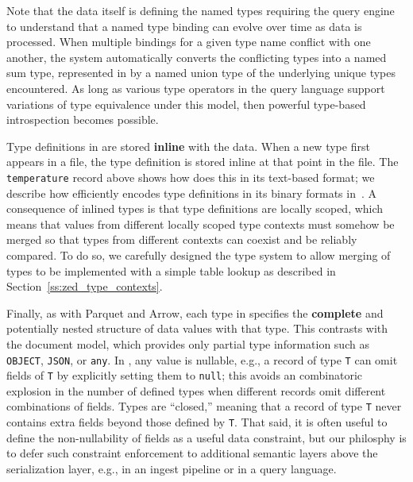 Note that the data itself is defining the named types requiring the query engine to understand that a named type binding can evolve over time as data is processed.  When multiple bindings for a given type name conflict with one another, the system automatically converts the conflicting types into a named sum type, represented in \sys{} by a named union type of the underlying unique types encountered.  As long as various type operators in the query language support variations of type equivalence under this model, then powerful type-based introspection becomes possible. 

Type definitions in \sys{} are stored {\bf inline} with the data. When a new type first appears in a \sys{} file, the type definition is stored inline at that point in the file. The \texttt{temperature} record above shows how \sys{} does this in its text-based format; we describe  how \sys{} efficiently encodes type definitions in its binary formats in~. A consequence of inlined types is that type definitions are locally scoped, which means that values from different locally scoped type contexts must somehow be merged so that types from different contexts can coexist and be reliably compared. To do so, we carefully designed the \sys{} type system to allow merging of types to be implemented with a simple table lookup as described in Section~\ref{ss:zed_type_contexts}.

Finally, as with Parquet and Arrow, each type in \sys{} specifies the {\bf complete} and potentially nested structure of data values with that type. This contrasts with the document model, which provides only partial type information such as \texttt{OBJECT}, \texttt{JSON}, or \texttt{any}. In \sys{}, any value is nullable, e.g., a record of type \texttt{T} can omit fields of \texttt{T} by explicitly setting them to \texttt{null}; this avoids an combinatoric explosion in the number of defined types when different records omit different combinations of fields. Types are ``closed,'' meaning that a record of type \texttt{T} never contains extra fields beyond those defined by \texttt{T}.  That said, it is often useful to define the non-nullability of fields as a useful data constraint, but our philosphy is to defer such constraint enforcement to additional semantic layers above the \sys{} serialization layer, e.g., in an ingest pipeline or in a query language.

